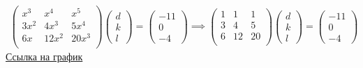 \begin{gather}
    \begin{pmatrix}
        x^3 & x^4 & x^5 \\
        3x^2 & 4x^3 & 5x^4 \\
        6x & 12x^2 & 20x^3 \\
    \end{pmatrix}
    \begin{pmatrix}
        d \\ k \\ l
    \end{pmatrix}
    =
    \begin{pmatrix}
        -11 \\ 0 \\ -4
    \end{pmatrix}
    \implies
    \begin{pmatrix}
        1 & 1 & 1 \\
        3 & 4 & 5 \\
        6 & 12 & 20 \\
    \end{pmatrix}
    \begin{pmatrix}
        d \\ k \\ l
    \end{pmatrix}
    =
    \begin{pmatrix}
        -11 \\ 0 \\ -4
    \end{pmatrix}
\end{gather}
\href{https://www.desmos.com/calculator/vsnlbomsq6}{Ссылка на график}
